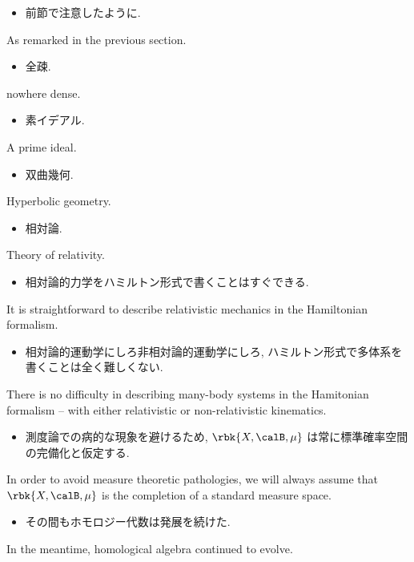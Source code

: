 \documentclass[openany, a4paper, oneside]{jsbook}
\begin{document}
\begin{itemize}
\item 前節で注意したように. \cite{LiebSeiringer1}
\end{itemize}
As remarked in the previous section.

\begin{itemize}
\item 全疎.
\end{itemize}
nowhere dense.

\begin{itemize}
\item 素イデアル.
\end{itemize}
A prime ideal.

\begin{itemize}
\item 双曲幾何.
\end{itemize}
Hyperbolic geometry.

\begin{itemize}
\item 相対論.
\end{itemize}
Theory of relativity.

\begin{itemize}
\item 相対論的力学をハミルトン形式で書くことはすぐできる. \cite{LiebSeiringer1}
\end{itemize}
It is straightforward to describe relativistic mechanics in the Hamiltonian formalism.

\begin{itemize}
\item 相対論的運動学にしろ非相対論的運動学にしろ, ハミルトン形式で多体系を書くことは全く難しくない. \cite{LiebSeiringer1}
\end{itemize}
There is no difficulty in describing many-body systems in the Hamitonian formalism
-- with either relativistic or non-relativistic kinematics.

\begin{itemize}
\item 測度論での病的な現象を避けるため, $\rbk{X, \calB, \mu}$ は常に標準確率空間の完備化と仮定する.
\end{itemize}
In order to avoid measure theoretic pathologies, we will always assume that
$\rbk{X, \calB, \mu}$ is the completion of a standard measure space.

\begin{itemize}
\item その間もホモロジー代数は発展を続けた. \cite{CharlesWeibel1}
\end{itemize}
In the meantime, homological algebra continued to evolve.
\end{document}
